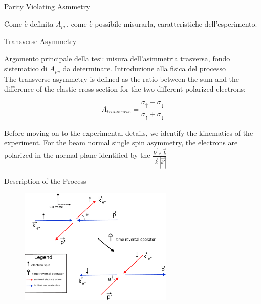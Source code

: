 \documentclass[9pt,a4paper]{beamer}
\begin{document}
\begin{frame}{Parity Violating Asmmetry}

Come è definita $A_{pv}$, come è possibile misurarla, caratteristiche dell'esperimento.

\end{frame}

\begin{frame}{Transverse Asymmetry}

Argomento principale della tesi: misura dell'asimmetria trasversa, fondo sistematico di $A_{pv}$ da determinare. Introduzione alla fisica del processo 
\\ 
The transverse asymmetry is defined as the ratio between the sum and the difference of the elastic cross section for the two different polarized electrons: 

\begin{equation*}
A_{transverse} = \dfrac{\sigma_{\uparrow} -  \sigma_{\downarrow}}{\sigma_{\uparrow} + \sigma_{\downarrow}}
\end{equation*}

Before moving on to the experimental details, we identify the kinematics of the experiment. For the beam normal single spin asymmetry, the electrons are polarized in the normal plane identified by the $\frac{\vec{k'} \wedge \vec{k}}{ |\vec{k}| |\vec{k'}|}$ 
\end{frame}

\begin{frame}{Description of the Process}

\begin{figure}[hbtp]
\centering
\includegraphics[width = 0.65\textwidth]{figures/scattering.pdf}
\hspace{1cm}
\end{figure}

\end{frame}
\end{document}
